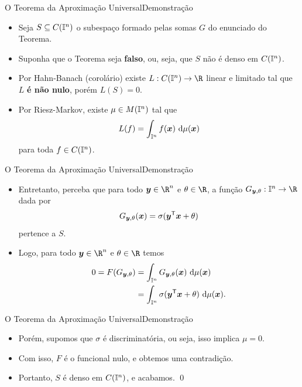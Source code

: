 \documentclass[13pt]{beamer}
\begin{document}
\begin{frame}{O Teorema da Aproximação Universal}{Demonstração}
    \begin{itemize}
        \item<1-> Seja \( S \subseteq C ( \mathbb{I}^{ n } ) \) o subespaço formado pelas somas \( G \) do enunciado do Teorema.
        \item<2-> Suponha que o Teorema seja \textbf{falso}, ou, seja, que \( S \) não é denso em \( C ( \mathbb{I}^{ n } ) \).
        \item<3-> Por Hahn-Banach (corolário) existe \( L : C ( \I^{ n } ) \to \R \) linear e limitado tal que \( L \) \textbf{é não nulo}, porém \( L ( S ) = 0 \).
        \item<4-> Por Riesz-Markov, existe \( \mu \in M ( \mathbb{I}^{ n } ) \) tal que
            \begin{equation*}
                L ( f ) = \int_{ \mathbb{I}^{ n } } f ( \bm{x} ) \ \mathrm{d}\mu ( \bm{x} )
            \end{equation*}
            para toda \( f \in C ( \mathbb{I}^{ n } ) \).
    \end{itemize}
\end{frame}

\begin{frame}{O Teorema da Aproximação Universal}{Demonstração}
    \begin{itemize}
        \item<1-> Entretanto, perceba que para todo \( \bfy \in \R^{ n } \) e \( \theta \in \R \), a função \( G_{ \bfy, \theta } : \I^{ n } \to \R \) dada por
            \begin{equation*}
                G_{ \bm{y}, \theta } ( \bm{x} ) = \sigma ( \bm{y}^{ \mathsf{T} } \bm{x} + \theta )
            \end{equation*}
            pertence a \( S \).
        \item<2-> Logo, para todo \( \bfy \in \R^{ n } \) e \( \theta \in \R \) temos
            \begin{align*}
                0 = F ( G_{ \bm{y}, \theta } ) &= \int_{ \mathbb{I}^{ n } } G_{ \bm{y}, \theta } ( \bm{x} ) \ \mathrm{d} \mu ( \bm{x} ) \\
                                             &= \int_{ \mathbb{I}^{ n } } \sigma ( \bm{y}^{ \mathsf{T} } \bm{x} + \theta ) \ \mathrm{d} \mu ( \bm{x} )
            .\end{align*}
    \end{itemize}
\end{frame}

\begin{frame}{O Teorema da Aproximação Universal}{Demonstração}
    \begin{itemize}
        \item<1-> Porém, supomos que \( \sigma \) é discriminatória, ou seja, isso implica \( \mu = 0 \).
        \item<2-> Com isso, \( F \) é o funcional nulo, e obtemos uma contradição.
        \item<3-> Portanto, \( S \) é denso em \( C (  \mathbb{I}^{ n } ) \), e acabamos. \hfill \qed
    \end{itemize}
\end{frame}
\end{document}
